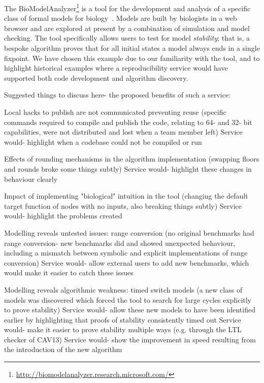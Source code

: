 \documentclass{llncs}
\begin{document}

The
BioModelAnalyzer\footnote{\url{http://biomodelanalyzer.research.microsoft.com/}}
is a tool for the development and analysis of a specific class of
formal models for
biology~\cite{benque2012,cook-et-al:2010,cook2014}. Models are built
by biologists in a web browser and are explored at present by a
combination of simulation and model checking. The tool specifically
allows users to test for model \emph{stability}; that is, a bespoke
algorithm proves that for all initial states a model always ends in a
single fixpoint. We have chosen this example due to our familiarity
with the tool, and to highlight historical examples where a
reproducibility service would have supported both code development and
algorithm discovery.

Suggested things to discuss here- the proposed benefits of such a service:

Local hacks to publish are not communicated preventing reuse
(specific commands required to compile and publish the code, 
relating to 64- and 32- bit capabilities, were not distributed
and lost when a team member left)
Service would- highlight when a codebase could not be compiled or run

Effects of rounding mechanisms in the algorithm implementation
(swapping floors and rounds broke some things subtly)
Service would- highlight these changes in behaviour clearly

Impact of implementing "biological" intuition in the tool
(changing the default target function of nodes with no inputs, also
breaking things subtly)
Service would- highlight the problems created

Modelling reveals untested issues: range conversion
(no original benchmarks had range conversion- new benchmarks did
and showed unexpected behaviour, including a mismatch between symbolic
and explicit implementations of range conversion)
Service would- allow external users to add new benchmarks, which would make it
easier to catch these issues

Modelling reveals algorithmic weakness: timed switch models 
(a new class of models was discovered which forced the tool to search 
for large cycles explicitly to prove stability)
Service would- allow these new models to have been identified earlier
by highlighting that proofs of stability consistently timed out
Service would- make it easier to prove stability multiple ways (e.g.
through the LTL checker of CAV13)
Service would- show the improvement in speed resulting from the introduction
of the new algorithm
\end{document}

